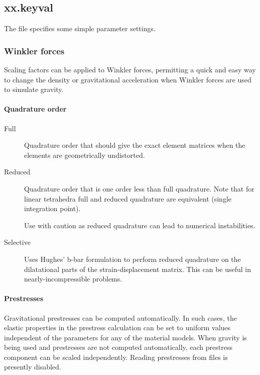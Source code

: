 \subsection{xx.keyval}

The  file specifies some simple parameter
settings.

\subsubsection{Winkler forces}

Scaling factors can be applied to Winkler forces, permitting a quick
and easy way to change the density or gravitational acceleration when
Winkler forces are used to simulate gravity.

\paragraph{Quadrature order}

\begin{description}
\item[Full] Quadrature order that should give the exact element
  matrices when the elements are geometrically undistorted.
\item[Reduced] Quadrature order that is one order less than full
  quadrature. Note that for linear tetrahedra full and reduced
  quadrature are equivalent (single integration point).

  \begin{warning}
    Use with caution as reduced quadrature can lead to numerical
    instabilities.
  \end{warning}
  
\item[Selective] Uses Hughes' b-bar formulation to perform reduced
  quadrature on the dilatational parts of the strain-displacement
  matrix.  This can be useful in nearly-incompressible problems.
\end{description}

\paragraph{Prestresses}

Gravitational prestresses can be computed automatically. In such
cases, the elastic properties in the prestress calculation can be set
to uniform values independent of the parameters for any of the
material models. When gravity is being used and prestresses are not
computed automatically, each prestress component can be scaled
independently. Reading prestresses from files is presently disabled.

